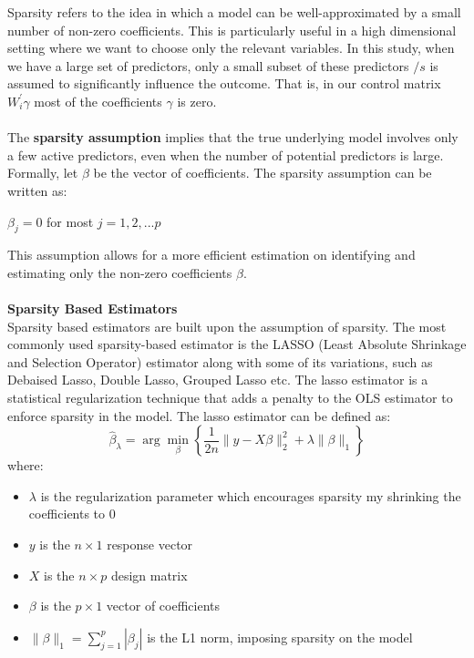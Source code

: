 Sparsity refers to the idea in which a model can be well-approximated by a small number of non-zero coefficients. This is particularly useful in a high dimensional setting where we want to choose only the relevant variables. In this study, when we have a large set of predictors, only a small subset of these predictors $/s$ is assumed to significantly influence the outcome. That is, in our control matrix $W_i^{\prime} \gamma$ most of the coefficients $\gamma$ is zero. 
\\
\\ 
The \textbf{sparsity assumption} implies that the true underlying model involves only a few active predictors, even when the number of potential predictors is large. Formally, let $\beta$ be the vector of coefficients. The sparsity assumption can be written as:
\begin{center}
    $\beta_j = 0$ for most $j = 1, 2, ...p$
\end{center}
This assumption allows for a more efficient estimation on identifying and estimating only the non-zero coefficients $\beta$.\\
\\ 
\textbf{Sparsity Based Estimators}\\
Sparsity based estimators are built upon the assumption of sparsity. The most commonly used sparsity-based estimator is the LASSO (Least Absolute Shrinkage and Selection Operator) estimator along  with some of its variations, such as Debaised Lasso, Double Lasso, Grouped Lasso etc. The lasso estimator is a statistical regularization technique that adds a penalty to the OLS estimator to enforce sparsity in the model. The lasso estimator can be defined as: 
\[
\hat{\beta}_\lambda = \arg\min_{\beta} \left\{ \frac{1}{2n} \| y - X\beta \|_2^2 + \lambda \|\beta\|_1 \right\}
\]
where:
\begin{itemize}
    \item $\lambda$ is the regularization parameter which encourages sparsity my shrinking the coefficients to 0
    \item $y$ is the $n \times 1$ response vector
    \item $X$ is the $n \times p$ design matrix
    \item $\beta$ is the $p \times 1$ vector of coefficients
    \item $\|\beta\|_1 = \sum_{j=1}^{p} |\beta_j|$ is the L1 norm, imposing sparsity on the model
\end{itemize}\\
\\
\\


